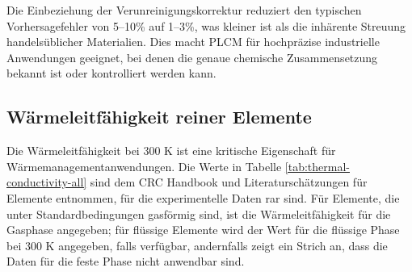 \documentclass[12pt,a4paper]{article}
\begin{document}
	Die Einbeziehung der Verunreinigungskorrektur reduziert den typischen Vorhersagefehler von 5–10\% auf 1–3\%, was kleiner ist als die inhärente Streuung handelsüblicher Materialien. Dies macht PLCM für hochpräzise industrielle Anwendungen geeignet, bei denen die genaue chemische Zusammensetzung bekannt ist oder kontrolliert werden kann.
	
	\subsection{Wärmeleitfähigkeit reiner Elemente}
	\label{subsec:thermal-conductivity-elements}
	
	Die Wärmeleitfähigkeit bei 300 K ist eine kritische Eigenschaft für Wärmemanagementanwendungen. Die Werte in Tabelle \ref{tab:thermal-conductivity-all} sind dem CRC Handbook \cite{CRC} und Literaturschätzungen für Elemente entnommen, für die experimentelle Daten rar sind. Für Elemente, die unter Standardbedingungen gasförmig sind, ist die Wärmeleitfähigkeit für die Gasphase angegeben; für flüssige Elemente wird der Wert für die flüssige Phase bei 300 K angegeben, falls verfügbar, andernfalls zeigt ein Strich an, dass die Daten für die feste Phase nicht anwendbar sind.
	
\end{document}
